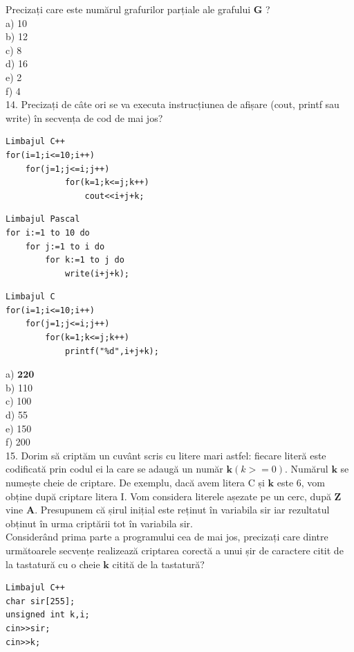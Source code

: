 \documentclass[10pt]{article}
\begin{document}
Precizați care este numărul grafurilor parțiale ale grafului $\mathbf{G}$ ?\\
a) 10\\
b) 12\\
c) 8\\
d) 16\\
e) 2\\
f) 4\\
14. Precizați de câte ori se va executa instrucțiunea de afișare (cout, printf sau write) în secvența de cod de mai jos?

\begin{verbatim}
Limbajul C++
for(i=1;i<=10;i++)
    for(j=1;j<=i;j++)
            for(k=1;k<=j;k++)
                cout<<i+j+k;
\end{verbatim}

\begin{verbatim}
Limbajul Pascal
for i:=1 to 10 do
    for j:=1 to i do
        for k:=1 to j do
            write(i+j+k);
\end{verbatim}

\begin{verbatim}
Limbajul C
for(i=1;i<=10;i++)
    for(j=1;j<=i;j++)
        for(k=1;k<=j;k++)
            printf("%d",i+j+k);
\end{verbatim}

a) $\mathbf{2 2 0}$\\
b) 110\\
c) 100\\
d) 55\\
e) 150\\
f) 200\\
15. Dorim să criptăm un cuvânt scris cu litere mari astfel: fiecare literă este codificată prin codul ei la care se adaugă un număr $\mathbf{k}(k>=0)$. Numărul $\mathbf{k}$ se numește cheie de criptare. De exemplu, dacă avem litera C și $\mathbf{k}$ este 6, vom obține după criptare litera I. Vom considera literele așezate pe un cerc, după $\mathbf{Z}$ vine $\mathbf{A}$. Presupunem că șirul inițial este reținut în variabila sir iar rezultatul obținut în urma criptării tot în variabila sir.\\
Considerând prima parte a programului cea de mai jos, precizați care dintre următoarele secvențe realizează criptarea corectă a unui șir de caractere citit de la tastatură cu o cheie $\mathbf{k}$ citită de la tastatură?

\begin{verbatim}
Limbajul C++
char sir[255];
unsigned int k,i;
cin>>sir;
cin>>k;
\end{verbatim}
\end{document}
